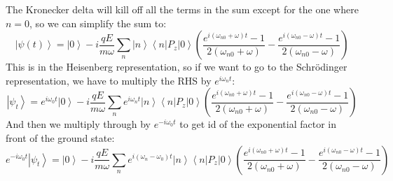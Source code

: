 \documentclass[12pt]{article}
\begin{document}
The Kronecker delta will kill off all the terms in the sum except for the one where $n=0$, so we can simplify the sum to:
\begin{equation}
\left|\psi(t)\right\rangle = \left|0\right\rangle -i \frac{q E}{m \omega} \sum_{n} \left|n\right\rangle \left\langle n\left|P_{z}\right|0\right\rangle \left( \frac{e^{i (\omega _{n0} + \omega) t} - 1}{2 (\omega _{n0} + \omega)} - \frac{e^{i (\omega _{n0} - \omega) t} - 1}{2 (\omega _{n0} - \omega)} \right)
\end{equation}
This is in the Heisenberg representation, so if we want to go to the Schrödinger representation, we have to multiply the RHS by $e^{i\omega_n t}$:
\begin{equation}
\left|\psi_t\right\rangle = e^{i\omega_{0} t} \left|0\right\rangle -i \frac{q E}{m \omega} \sum_{n} e^{i\omega_n t} \left|n\right\rangle \left\langle n\left|P_{z}\right|0\right\rangle \left( \frac{e^{i (\omega _{n0} + \omega) t} - 1}{2 (\omega _{n0} + \omega)} - \frac{e^{i (\omega _{n0} - \omega) t} - 1}{2 (\omega _{n0} - \omega)} \right)
\end{equation}
And then we multiply through by $e^{-i\omega_0 t}$ to get id of the exponential factor in front of the ground state:
\begin{equation}
e^{-i\omega_0 t}\left|\psi_t\right\rangle = \left|0\right\rangle -i \frac{q E}{m \omega} \sum_{n} e^{i(\omega_n - \omega_0) t} \left|n\right\rangle \left\langle n\left|P_{z}\right|0\right\rangle \left( \frac{e^{i (\omega _{n0} + \omega) t} - 1}{2 (\omega _{n0} + \omega)} - \frac{e^{i (\omega _{n0} - \omega) t} - 1}{2 (\omega _{n0} - \omega)} \right)
\end{equation}
\end{document}
